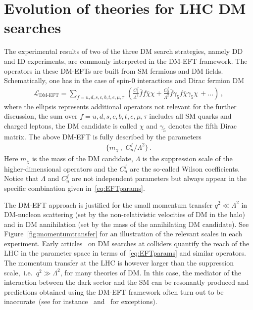 \documentclass[a4paper, 11pt,notoc]{article}
\begin{document}

\section{Evolution of theories for LHC DM searches} 
\label{sec:evolution}

The experimental results of two of the three DM search strategies, namely DD and ID experiments, are commonly interpreted in the DM-EFT framework. The operators in these DM-EFTs are built from SM fermions and DM fields. Schematically, one has in the case of spin-0 interactions and Dirac fermion DM
\begin{align}\label{eq:EFT}
\mathcal{L}_\text{DM-EFT}= \sum_{f=u,d,s,c,b,t,e,\mu,\tau} \,\left(\frac{C_{1}^f}{\Lambda^2} \bar f f \bar \chi \chi  +\frac{C_{2}^f}{\Lambda^2} \bar  f \gamma_5 f \bar \chi\gamma_5 \chi \,+\ldots \right) \,, 
\end{align}
 where the ellipsis represents additional operators not relevant for the further discussion, the sum over $f=u,d,s,c,b,t,e,\mu,\tau$ includes all SM quarks and charged leptons, the DM candidate is called $\chi$  and $\gamma_5$ denotes the fifth Dirac matrix. The above DM-EFT is fully described by the parameters
\begin{align}\label{eq:EFTparams}
\big\{ m_\chi\,,\,\, C_n^f/\Lambda^2 \big\} \,.
\end{align}
Here $m_\chi$ is the mass of the DM candidate, $\Lambda$ is the suppression scale of the higher-dimensional operators and the $C_n^f$ are the so-called Wilson coefficients. Notice that $\Lambda$ and $C_n^f$ are not independent parameters but always appear in the specific combination given in~\eqref{eq:EFTparams}. 

The DM-EFT approach is justified for the small momentum transfer $q^2\ll \Lambda^2$ in DM-nucleon scattering (set by the non-relativistic velocities of DM in the halo) and in DM annihilation (set by the mass of the annihilating DM candidate). See Figure~\ref{fig:momentumtransfer} for an illustration of the relevant scales in each experiment. Early articles~\cite{Cao:2009uw,Beltran:2010ww,Goodman:2010yf,Bai:2010hh,Goodman:2010ku,Fox:2011pm} on DM searches at colliders quantify the reach of the LHC in the parameter space in terms of~\eqref{eq:EFTparams} and similar operators. The momentum transfer at the LHC is however larger than the suppression scale,~i.e.~$q^2 \gg \Lambda^2$, for many theories of DM.  In this case, the mediator of the interaction between the dark sector and the SM can be resonantly produced and predictions  obtained using the DM-EFT framework often turn out to be inaccurate~(see for instance~\cite{Bai:2010hh,Fox:2011fx,Shoemaker:2011vi,Busoni:2013lha,Buchmueller:2013dya,Busoni:2014sya,Busoni:2014haa,Racco:2015dxa} and~\cite{Bruggisser:2016nzw,Bruggisser:2016ixa} for exceptions). 
\end{document}
